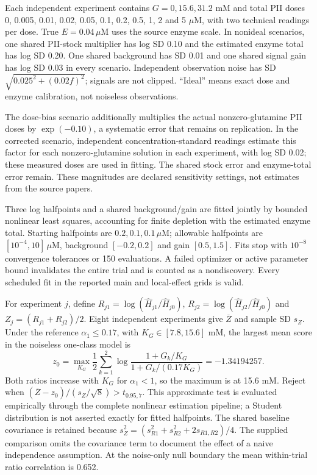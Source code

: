 \documentclass[11pt]{article}
\begin{document}
Each independent experiment contains $G=0,15.6,31.2$ mM and total PII doses 0, 0.005, 0.01, 0.02, 0.05, 0.1, 0.2, 0.5, 1, 2 and 5 $\mu$M, with two technical readings per dose. True $E=0.04\,\mu$M uses the source enzyme scale. In nonideal scenarios, one shared PII-stock multiplier has log SD 0.10 and the estimated enzyme total has log SD 0.20. One shared background has SD 0.01 and one shared signal gain has log SD 0.03 in every scenario. Independent observation noise has SD $\sqrt{0.025^2+(0.02f)^2}$; signals are not clipped. ``Ideal'' means exact dose and enzyme calibration, not noiseless observations.

The dose-bias scenario additionally multiplies the actual nonzero-glutamine PII doses by $\exp(-0.10)$, a systematic error that remains on replication. In the corrected scenario, independent concentration-standard readings estimate this factor for each nonzero-glutamine solution in each experiment, with log SD 0.02; these measured doses are used in fitting. The shared stock error and enzyme-total error remain. These magnitudes are declared sensitivity settings, not estimates from the source papers.

Three log halfpoints and a shared background/gain are fitted jointly by bounded nonlinear least squares, accounting for finite depletion with the estimated enzyme total. Starting halfpoints are $0.2,0.1,0.1\,\mu$M; allowable halfpoints are $[10^{-4},10]\,\mu$M, background $[-0.2,0.2]$ and gain $[0.5,1.5]$. Fits stop with $10^{-8}$ convergence tolerances or 150 evaluations. A failed optimizer or active parameter bound invalidates the entire trial and is counted as a nondiscovery. Every scheduled fit in the reported main and local-effect grids is valid.

For experiment $j$, define $R_{j1}=\log(\widehat H_{j1}/\widehat H_{j0})$, $R_{j2}=\log(\widehat H_{j2}/\widehat H_{j0})$ and $Z_j=(R_{j1}+R_{j2})/2$. Eight independent experiments give $\overline Z$ and sample SD $s_Z$. Under the reference $\alpha_1\leq0.17$, with $K_G\in[7.8,15.6]$ mM, the largest mean score in the noiseless one-class model is
\[
 z_0=\max_{K_G}\frac12\sum_{k=1}^2\log\frac{1+G_k/K_G}{1+G_k/(0.17K_G)}=-1.34194257.
\]
Both ratios increase with $K_G$ for $\alpha_1<1$, so the maximum is at 15.6 mM. Reject when $(\overline Z-z_0)/(s_Z/\sqrt8)>t_{0.95,7}$. This approximate test is evaluated empirically through the complete nonlinear estimation pipeline; a Student distribution is not asserted exactly for fitted halfpoints. The shared baseline covariance is retained because $s_Z^2=(s_{R1}^2+s_{R2}^2+2s_{R1,R2})/4$. The supplied comparison omits the covariance term to document the effect of a naive independence assumption. At the noise-only null boundary the mean within-trial ratio correlation is 0.652.
\end{document}
